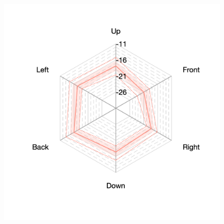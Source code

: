 \documentclass[11pt,a4j]{jreport}
\begin{document}
\begin{figure}[H]
\begin{minipage}[b]{.33\textwidth}
    \label{fig:S06early}
  \end{minipage}%
  \begin{minipage}[b]{.33\textwidth}
    \centering
    \includegraphics[width=1\linewidth]{images/realHallDirSt/early_S05_allhall.png}
    \label{fig:S04early}
  \end{minipage}


\end{figure}
\end{document}
